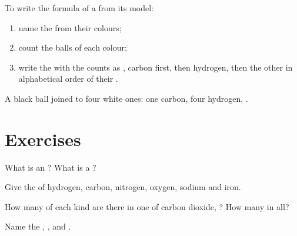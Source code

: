 \begin{method}\label{met:g7:atoms-and-molecules:model}
To write the formula of a  from its model:
\begin{enumerate}
  \item name the  from their colours;
  \item count the balls of each colour;
  \item write the  with the counts as , carbon first,
        then hydrogen, then the other  in alphabetical order of
        their .
\end{enumerate}
A black ball joined to four white ones: one carbon, four hydrogen,
.
\end{method}

\section{Exercises}

\begin{exercise}[$\star$]\label{exo:g7:atoms-and-molecules:1}
What is an ? What is a ?
\end{exercise}

\begin{exercise}[$\star$]\label{exo:g7:atoms-and-molecules:2}
Give the  of hydrogen, carbon, nitrogen, oxygen, sodium and
iron.
\end{exercise}

\begin{exercise}[$\star$]\label{exo:g7:atoms-and-molecules:3}
How many  of each kind are there in one  of carbon
dioxide, ? How many  in all?
\end{exercise}

\begin{exercise}[$\star$]\label{exo:g7:atoms-and-molecules:4}
Name the  , ,  and .
\end{exercise}

